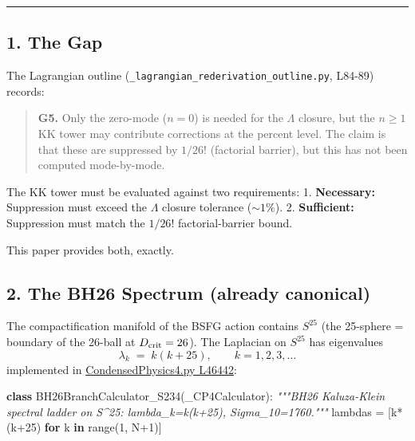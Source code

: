 \documentclass[
]{article}
\newenvironment{Shaded}{}{}
\newcommand{\BuiltInTok}[1]{\textcolor[rgb]{0.00,0.50,0.00}{#1}}
\newcommand{\CommentTok}[1]{\textcolor[rgb]{0.38,0.63,0.69}{\textit{#1}}}
\newcommand{\ControlFlowTok}[1]{\textcolor[rgb]{0.00,0.44,0.13}{\textbf{#1}}}
\newcommand{\DecValTok}[1]{\textcolor[rgb]{0.25,0.63,0.44}{#1}}
\newcommand{\KeywordTok}[1]{\textcolor[rgb]{0.00,0.44,0.13}{\textbf{#1}}}
\newcommand{\NormalTok}[1]{#1}
\newcommand{\OperatorTok}[1]{\textcolor[rgb]{0.40,0.40,0.40}{#1}}
\begin{document}
\begin{center}\rule{0.5\linewidth}{0.5pt}\end{center}

\subsection{1. The Gap}\label{the-gap}

The Lagrangian outline (\texttt{\_lagrangian\_rederivation\_outline.py},
L84-89) records:

\begin{quote}
\textbf{G5.} Only the zero-mode (\(n=0\)) is needed for the \(\Lambda\)
closure, but the \(n\geq 1\) KK tower may contribute corrections at the
percent level. The claim is that these are suppressed by \(1/26!\)
(factorial barrier), but this has not been computed mode-by-mode.
\end{quote}

The KK tower must be evaluated against two requirements: 1.
\textbf{Necessary:} Suppression must exceed the \(\Lambda\) closure
tolerance (\(\sim 1\%\)). 2. \textbf{Sufficient:} Suppression must match
the \(1/26!\) factorial-barrier bound.

This paper provides both, exactly.

\subsection{2. The BH26 Spectrum (already
canonical)}\label{the-bh26-spectrum-already-canonical}

The compactification manifold of the BSFG action contains \(S^{25}\)
(the 25-sphere = boundary of the 26-ball at \(D_{\rm crit}=26\)). The
Laplacian on \(S^{25}\) has eigenvalues
\[\lambda_k \;=\; k(k+25), \qquad k=1,2,3,\dots\] implemented in
\href{CondensedPhysics4.py\#L46442}{CondensedPhysics4.py L46442}:

\begin{Shaded}
\begin{Highlighting}[]
\KeywordTok{class}\NormalTok{ BH26BranchCalculator\_S234(\_CP4Calculator):}
    \CommentTok{"""BH26 Kaluza{-}Klein spectral ladder on S\^{}25: lambda\_k=k(k+25), Sigma\_10=1760."""}
\NormalTok{    lambdas }\OperatorTok{=}\NormalTok{ [k}\OperatorTok{*}\NormalTok{(k}\OperatorTok{+}\DecValTok{25}\NormalTok{) }\ControlFlowTok{for}\NormalTok{ k }\KeywordTok{in} \BuiltInTok{range}\NormalTok{(}\DecValTok{1}\NormalTok{, N}\OperatorTok{+}\DecValTok{1}\NormalTok{)]}
\end{Highlighting}
\end{Shaded}
\end{document}
